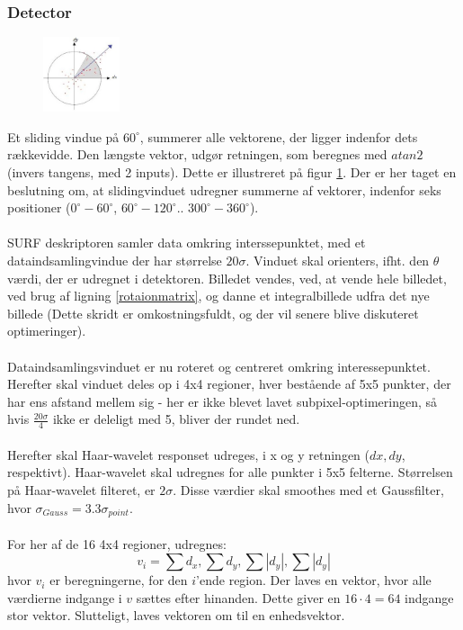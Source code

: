 \subsubsection{Detector}
\begin{figure}[H]
    \centering
    \includegraphics[width=0.2\textwidth]{fig/surforientation.jpg}
     \vspace{-1em}
    \begin{center}    
       \caption{\textcolor{gray}{\footnotesize \textit{ }}}
    \label{fig:surforientation}
     \end{center}
     \vspace{-2.5em}
  \end{figure} \noindent
Et sliding vindue på $60^{\circ}$, summerer alle vektorene, der ligger indenfor dets rækkevidde. Den længste vektor, udgør retningen, som beregnes med $atan2$ (invers tangens, med 2 inputs). Dette er illustreret på figur \ref{fig:surforientation}. Der er her taget en beslutning om, at slidingvinduet udregner summerne af vektorer, indenfor seks positioner ($0^{\circ}-60^{\circ}$, $60^{\circ}-120^{\circ}$.. $300^{\circ}-360^{\circ}$). 
\\
\\
SURF deskriptoren samler data omkring interssepunktet, med et dataindsamlingvindue der har størrelse $20 \sigma$. Vinduet skal orienters, ifht. den $\theta$ værdi, der er udregnet i detektoren. Billedet vendes, ved, at vende hele billedet, ved brug af ligning \eqref{rotaionmatrix}, og danne et integralbillede udfra det nye billede (Dette skridt er omkostningsfuldt, og der vil senere blive diskuteret optimeringer).
\\
\\
Dataindsamlingsvinduet er nu roteret og centreret omkring interessepunktet. Herefter skal vinduet deles op i 4x4 regioner, hver bestående af 5x5 punkter, der har ens afstand mellem sig - her er ikke blevet lavet subpixel-optimeringen, så hvis $\frac{20\sigma}{4}$ ikke er deleligt med 5, bliver der rundet ned.
\\
\\
Herefter skal Haar-wavelet responset udreges, i x og y retningen ($dx, dy$, respektivt). Haar-wavelet skal udregnes for alle punkter i 5x5 felterne. Størrelsen på Haar-wavelet filteret, er $2\sigma$. Disse værdier skal smoothes med et Gaussfilter, hvor $\sigma_{Gauss} = 3.3\sigma_{point}$.
\\
\\
For her af de 16 4x4 regioner, udregnes: 
\begin{equation}
v_i = \sum d_x, \sum d_y, \sum |d_y|, \sum |d_y|
\label{surffeature}
\end{equation}
hvor $v_i$ er beregningerne, for den $i$'ende region. Der laves en vektor, hvor alle værdierne indgange i $v$ sættes efter hinanden. Dette giver en $16 \cdot 4 = 64$ indgange stor vektor. Slutteligt, laves vektoren om til en enhedsvektor.

